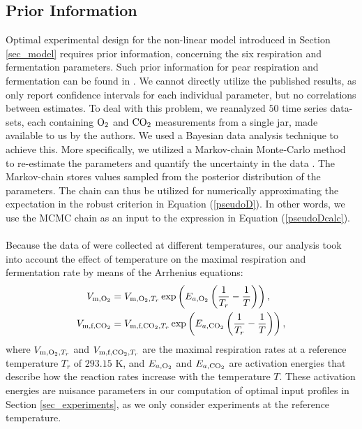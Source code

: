 \subsection{Prior Information}
Optimal experimental design for the non-linear model introduced in Section \ref{sec_model} requires prior information, concerning the six respiration and fermentation parameters. Such prior information for pear respiration and fermentation can be found in \textcite{ho}. We cannot directly utilize the published results, as \textcite{ho} only report confidence intervals for each individual parameter, but no correlations between estimates. To deal with this problem, we reanalyzed $50$ time series data-sets, each containing $\text{O}_2$ and $\text{CO}_2$ measurements from a single jar, made available to us by the authors. We used a Bayesian data analysis technique to achieve this. More specifically, we utilized a Markov-chain Monte-Carlo method to re-estimate the parameters and quantify the uncertainty in the data  \parencite{betancourt}. The Markov-chain stores values sampled from the posterior distribution of the parameters. The chain can thus be utilized for numerically approximating the expectation in the robust criterion in Equation (\ref{pseudoD}). In other words, we use the MCMC chain as an input to the expression in Equation (\ref{pseudoDcalc}).
\\
\\
Because the data of \textcite{ho} were collected at different temperatures, our analysis took into account the effect of temperature on the maximal respiration and fermentation rate by means of the Arrhenius equations:
\begin{equation}
\begin{aligned}
V_{\text{m},\text{O}_2} &=
V_{\text{m},\text{O}_2,T_r}\exp\left(E_{a,\text{O}_2}\left ( \frac{1}{T_r} - \frac{1}{T} \right) \right),\\
V_{\text{m,f,}\text{CO}_2} &= V_{\text{m,f,}\text{CO}_2,T_r}\exp\left(E_{a,\text{CO}_2}\left (\frac{1}{T_r} - \frac{1}{T} \right)\right),
\end{aligned}
\end{equation}
where $V_{\text{m},\text{O}_2,T_r}$ and $V_{\text{m,f,}\text{CO}_2,T_r}$ are the maximal respiration rates at a reference temperature $T_r$ of $293.15$ K, and $E_{a,\text{O}_2}$ and $E_{a,\text{CO}_2}$ are activation energies that describe how the reaction rates increase with the temperature $T$. These activation energies are nuisance parameters in our computation of optimal input profiles in Section \ref{sec_experiments}, as we only consider experiments at the reference temperature.
